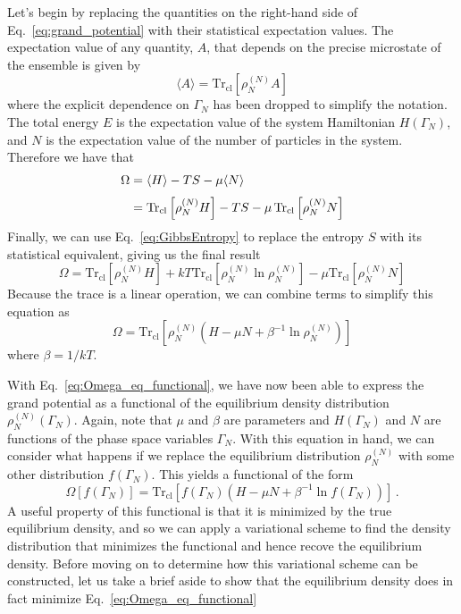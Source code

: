 \documentclass{report}
\newcommand{\trace}{\operatorname{Tr_{cl}}}
\begin{document}
Let's begin by replacing the quantities on the right-hand side of Eq.~\ref{eq:grand_potential} with their statistical expectation values. The expectation value of any quantity, \(A\), that depends on the precise microstate of the ensemble is given by 
\begin{equation}
    \langle A \rangle = \trace \left[\rho_N^{(N)}A\right]
    \label{eq:trace}
\end{equation}
where the explicit dependence on \(\Gamma_N\) has been dropped to simplify the notation. The total energy \(E\) is the expectation value of the system Hamiltonian \(H(\Gamma_N)\), and \(N\) is the expectation value of the number of particles in the system. Therefore we have that
\begin{equation}
    \setlength{\jot}{6pt}
    \begin{split}
    \Omega &= \langle H \rangle - TS - \mu \langle N \rangle \\
    &= \trace\left[\rho_N^{(N)}H\right] - TS - \mu \trace\left[\rho_N^{(N)}N\right]
    \end{split}
\end{equation}
Finally, we can use Eq.~\ref{eq:GibbsEntropy} to replace the entropy \(S\) with its statistical equivalent, giving us the final result
\begin{equation}
    \Omega = \trace\left[\rho_N^{(N)}H\right] + kT \trace\left[\rho_N^{(N)}\ln\rho_N^{(N)}\right] - \mu \trace\left[\rho_N^{(N)}N\right]
\end{equation}
Because the trace is a linear operation, we can combine terms to simplify this equation as
\begin{equation}
    \Omega = \trace\left[\rho_N^{(N)} \left(H - \mu N + \beta^{-1}\ln{\rho_N^{(N)}}\right)\right]
    \label{eq:Omega_eq_functional}
\end{equation}
where \(\beta = 1 / k T\). 

With Eq.~\ref{eq:Omega_eq_functional}, we have now been able to express the grand potential as a functional of the equilibrium density distribution \(\rho_N^{(N)}(\Gamma_N)\). Again, note that \(\mu \) and \(\beta \) are parameters and \(H(\Gamma_N)\) and \(N\) are functions of the phase space variables \(\Gamma_N\). With this equation in hand, we can consider what happens if we replace the equilibrium distribution \(\rho_N^{(N)}\) with some other distribution \(f(\Gamma_N)\). This yields a functional of the form
\begin{equation}
    \Omega\left[f(\Gamma_N)\right] = \trace\left[f(\Gamma_N) \left(H - \mu N + \beta^{-1}\ln{f(\Gamma_N)}\right)\right] \,.
    \label{eq:Omega_functional}
\end{equation}
A useful property of this functional is that it is minimized by the true equilibrium density, and so we can apply a variational scheme to find the density distribution that minimizes the functional and hence recove the equilibrium density. Before moving on to determine how this variational scheme can be constructed, let us take a brief aside to show that the equilibrium density does in fact minimize Eq.~\ref{eq:Omega_eq_functional}
\end{document}
